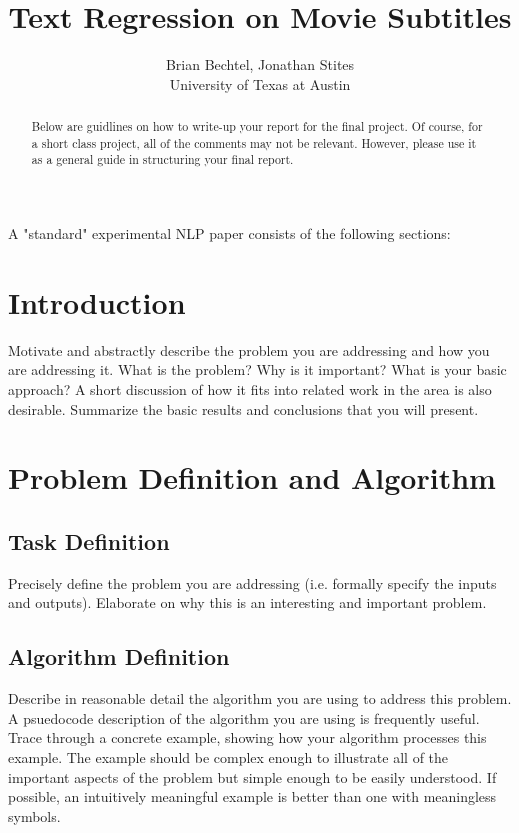 \documentclass[11pt]{article}
\begin{document}
\title{Text Regression on Movie Subtitles}
\author{Brian Bechtel, Jonathan Stites\\
       University of Texas at Austin}
\date{}
\maketitle

\begin{multicols}{2}
\begin{abstract}
Below are guidlines on how to write-up your report for the final project. Of course, for a short class project, all of the comments may not be relevant. However, please use it as a general guide in structuring your final report.
\end{abstract}

A "standard" experimental NLP paper consists of the following sections: 
\section{Introduction}
Motivate and abstractly describe the problem you are addressing and how you are addressing it. What is the problem? Why is it important? What is your basic approach? A short discussion of how it fits into related work in the area is also desirable. Summarize the basic results and conclusions that you will present.

\section{Problem Definition and Algorithm}
\subsection{Task Definition}
Precisely define the problem you are addressing (i.e. formally specify the inputs and outputs). Elaborate on why this is an interesting and important problem. 

\subsection{Algorithm Definition}
Describe in reasonable detail the algorithm you are using to address this problem. A psuedocode description of the algorithm you are using is frequently useful. Trace through a concrete example, showing how your algorithm processes this example. The example should be complex enough to illustrate all of the important aspects of the problem but simple enough to be easily understood. If possible, an intuitively meaningful example is better than one with meaningless symbols. 


\end{multicols}
\end{document}
